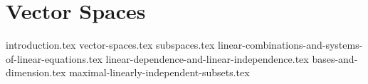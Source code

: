 \chapter{Vector Spaces}
{introduction.tex}
{vector-spaces.tex}
{subspaces.tex}
{linear-combinations-and-systems-of-linear-equations.tex}
{linear-dependence-and-linear-independence.tex}
{bases-and-dimension.tex}
{maximal-linearly-independent-subsets.tex}
